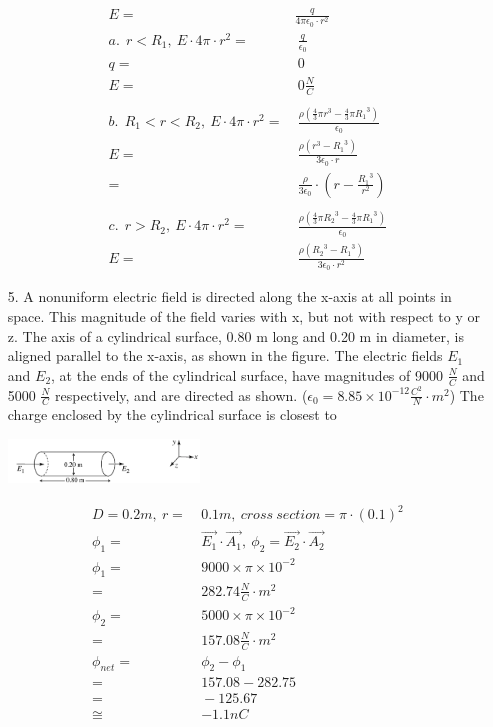\documentclass{article}
\begin{document}
\begin{enumerate}
  \begin{align*}
    E =& \frac{q}{4\pi\epsilon_0\cdot{r}^2}\\
    a.\ ~r < R_1,~E\cdot 4\pi\cdot{r}^2 =&~\frac{q}{\epsilon_0}\\
    q =&~0\\
    E =&~\boxed{0\frac{N}{C}}\\ \\
    b.\ ~R_1 < r < R_2,~E\cdot 4\pi\cdot{r}^2 =&~\frac{\rho(\frac{4}{3}\pi{r}^3-\frac{4}{3}\pi{R_1}^3)}{\epsilon_0}\\
    E =&~\frac{\rho(r^3-{R_1}^3)}{3\epsilon_0\cdot{r}}\\
    =&~\boxed{\frac{\rho}{3\epsilon_0}\cdot(r-\frac{{R_1}^3}{r^2})}\\ \\
    c.\ ~r > R_2,~E\cdot 4\pi\cdot{r}^2 =&~\frac{\rho(\frac{4}{3}\pi{R_2}^3-\frac{4}{3}\pi{R_1}^3)}{\epsilon_0}\\
    E =&~\boxed{\frac{\rho({R_2}^3-{R_1}^3)}{3\epsilon_0\cdot{r}^2}}
  \end{align*}
  \newpage
  \item[5.] A nonuniform electric field is directed along the x-axis at all points in space. This magnitude of the field varies with x, but not with respect to y or z. The axis of a cylindrical surface, 0.80 m long and 0.20 m in diameter, is aligned parallel to the x-axis, as shown in the figure. The electric fields \(E_1\) and \(E_2\), at the ends of the cylindrical surface, have magnitudes of 9000 \(\frac{N}{C}\) and 5000 \(\frac{N}{C}\) respectively, and are directed as shown. (\(\epsilon_0 = 8.85 \times 10^{-12} \frac{C^2}{N}\cdot m^2\)) The charge enclosed by the cylindrical surface is closest to 
  \item[] \begin{center}\includegraphics[width=0.4\textwidth]{2.png}\end{center}
  \begin{align*}
    D = 0.2m,~r =&~0.1m,~cross~section=\pi\cdot{(0.1)}^2\\
    \phi_1 =&~\overrightarrow{E_1}\cdot\overrightarrow{A_1},~\phi_2 = \overrightarrow{E_2}\cdot\overrightarrow{A_2}\\
    \phi_1 =&~9000\times\pi\times{10}^{-2}\\
           =&~282.74\frac{N}{C}\cdot{m^2}\\
    \phi_2 =&~5000\times\pi\times{10}^{-2}\\
           =&~157.08\frac{N}{C}\cdot{m^2}\\
    \phi_{net} =&~\phi_2-\phi_1\\
           =&~157.08 - 282.75\\
           =&~-125.67\\ 
           \cong&~\boxed{-1.1nC}
  \end{align*}  
\end{enumerate}
\end{document}

